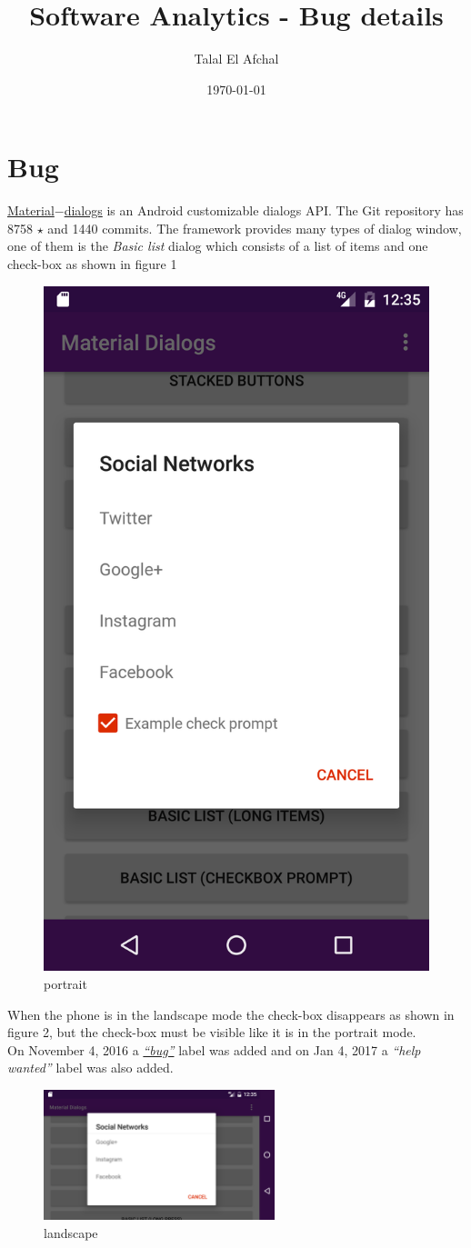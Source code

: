 \documentclass[12pt]{report}
\begin{document}
\title{Software Analytics - Bug details}
\author{Talal El Afchal}
\date{\today}
\maketitle
	\section*{Bug}
\href{https://github.com/afollestad/material-dialogs}{Material$-$dialogs} is an Android customizable dialogs API. The Git repository has 8758 $\star$ and 1440 commits.
The framework provides many types of dialog window, one of them is the \emph{Basic list} dialog which consists of a list of items and one check-box as shown in figure 1

\begin{figure}[H]
	\centering
	\includegraphics[height=0.4\textwidth]{screenshots/portrait.png}
	\caption{portrait}
\end{figure}
\noindent When the phone is in the landscape mode the check-box disappears as shown in figure 2, but the check-box must be visible like it is in the portrait mode.\\ On November 4, 2016 a \href{https://github.com/afollestad/material-dialogs/issues/1162}{\emph{``bug''}} label was added and on Jan 4, 2017 a \emph{``help wanted''} label was also added.\\


\begin{figure}[H]
	\centering
	\includegraphics[width=0.6\textwidth]{screenshots/landscape.png}
	\caption{landscape}
\end{figure}
\end{document}
